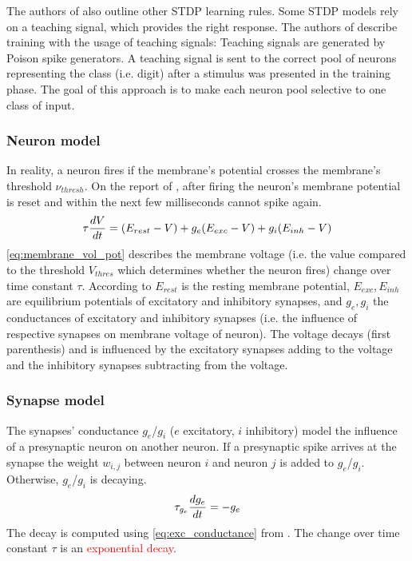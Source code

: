 The authors of \cite{SNN} also outline other \ac{STDP} learning rules.
Some \ac{STDP} models rely on a teaching signal, which provides the right response.
The authors of \cite{STDP_like} describe training with the usage of teaching signals:
Teaching signals are generated by Poison spike generators.
A teaching signal is sent to the correct pool of neurons representing the class (i.e. digit) after a stimulus was presented in the training phase.
The goal of this approach is to make each neuron pool selective to one class of input.

\subsubsection{Neuron model}
\label{subsubsec:neuron_model}
In reality, a neuron fires if the membrane's potential crosses the membrane's threshold $\nu_{thresh}$.
On the report of \cite{SNN}, after firing the neuron's membrane potential is reset and within the next few milliseconds cannot spike again.
%
\begin{equation}
    \centering
    \label{eq:membrane_vol_pot}
    \tau \frac{dV}{dt} = (E_{rest} - V) + g_e(E_{exc} - V) + g_i(E_{inh} - V)
\end{equation}
%
\autoref{eq:membrane_vol_pot} describes the membrane voltage (i.e. the value compared to the threshold $V_{thres}$ which determines whether the neuron fires) change over time constant $\tau$.
According to \cite{SNN} $E_{rest}$ is the resting membrane potential, $E_{exc}, E_{inh}$ are equilibrium potentials of excitatory and inhibitory synapses, and $g_e, g_i$ the conductances of excitatory and inhibitory synapses (i.e. the influence of respective synapses on membrane voltage of neuron). 
The voltage decays (first parenthesis) and is influenced by the excitatory synapses adding to the voltage and the inhibitory synapses subtracting from the voltage.

\subsubsection{Synapse model}
\label{subsubsec:synapse_model}
The synapses' conductance $g_e$/$g_i$ ($e$ excitatory, $i$ inhibitory) model the influence of a presynaptic neuron on another neuron.
If a presynaptic spike arrives at the synapse the weight $w_{i,j}$ between neuron $i$ and neuron $j$ is added to $g_e$/$g_i$.
Otherwise, $g_e$/$g_i$ is decaying.
%
\begin{equation}
    \centering
    \label{eq:exc_conductance}
    \tau_{g_e} \frac{dg_e}{dt} = - g_e
\end{equation}
%
The decay is computed using \autoref{eq:exc_conductance} from \cite{SNN}.
The change over time constant $\tau$ is an \textcolor{red}{exponential decay}.


